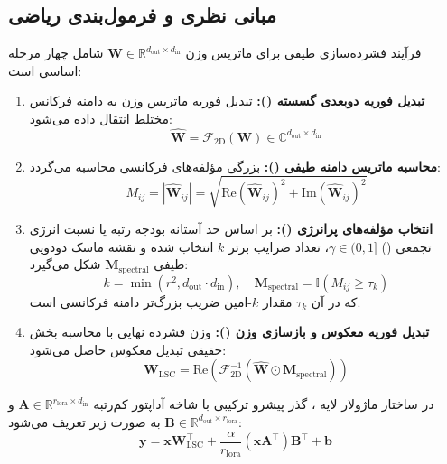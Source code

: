 \subsection{مبانی نظری و فرمول‌بندی ریاضی}
فرآیند فشرده‌سازی طیفی برای ماتریس وزن $\mathbf{W} \in \mathbb{R}^{d_{\text{out}} \times d_{\text{in}}}$ شامل چهار مرحله اساسی است:
\begin{enumerate}
    \item \textbf{تبدیل فوریه دو‌بعدی گسسته ():} تبدیل فوریه ماتریس وزن به دامنه فرکانس مختلط انتقال داده می‌شود:
    \begin{equation}
    \widehat{\mathbf{W}} = \mathcal{F}_{\text{2D}}(\mathbf{W}) \in \mathbb{C}^{d_{\text{out}} \times d_{\text{in}}}
    \end{equation}
    \item \textbf{محاسبه ماتریس دامنه طیفی ():} بزرگی مؤلفه‌های فرکانسی محاسبه می‌گردد:
    \begin{equation}
    M_{ij} = |\widehat{\mathbf{W}}_{ij}| = \sqrt{\text{Re}(\widehat{\mathbf{W}}_{ij})^2 + \text{Im}(\widehat{\mathbf{W}}_{ij})^2}
    \end{equation}
    \item \textbf{انتخاب مؤلفه‌های پرانرژی ():} بر اساس حد آستانه بودجه رتبه یا نسبت انرژی تجمعی () $\gamma \in (0, 1]$، تعداد ضرایب برتر $k$ انتخاب شده و نقشه ماسک دودویی طیفی $\mathbf{M}_{\text{spectral}}$ شکل می‌گیرد:
    \begin{equation}
    k = \min(r^2, d_{\text{out}} \cdot d_{\text{in}}), \quad \mathbf{M}_{\text{spectral}} = \mathbb{I}(M_{ij} \ge \tau_k)
    \end{equation}
    که در آن $\tau_k$ مقدار $k$-امین ضریب بزرگ‌تر دامنه فرکانسی است.
    \item \textbf{تبدیل فوریه معکوس و بازسازی وزن ():} وزن فشرده نهایی با محاسبه بخش حقیقی تبدیل معکوس حاصل می‌شود:
    \begin{equation}
    \mathbf{W}_{\text{LSC}} = \text{Re}\left(\mathcal{F}_{\text{2D}}^{-1}(\widehat{\mathbf{W}} \odot \mathbf{M}_{\text{spectral}})\right)
    \end{equation}
\end{enumerate}

در ساختار ماژولار لایه ، گذر پیشرو ترکیبی با شاخه آداپتور کم‌رتبه $\mathbf{A} \in \mathbb{R}^{r_{\text{lora}} \times d_{\text{in}}}$ و $\mathbf{B} \in \mathbb{R}^{d_{\text{out}} \times r_{\text{lora}}}$ به صورت زیر تعریف می‌شود:
\begin{equation}
\mathbf{y} = \mathbf{x} \mathbf{W}_{\text{LSC}}^\top + \frac{\alpha}{r_{\text{lora}}} (\mathbf{x} \mathbf{A}^\top) \mathbf{B}^\top + \mathbf{b}
\end{equation}

